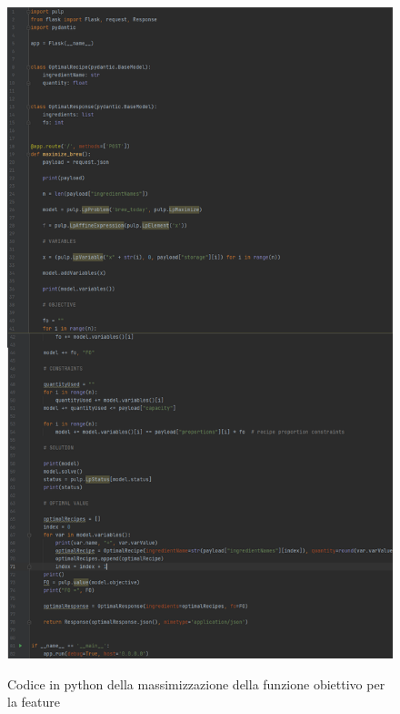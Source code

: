 \documentclass{article}
\begin{document}
\begin{figure}[h!]
\centering
\includegraphics[scale=0.51]{maximize1.PNG}
\label{fig:Codice in python della massimizzazione della funzione obiettivo per la feature}
\caption{Codice in python della massimizzazione della funzione obiettivo per la feature}
\end{figure}
\clearpage
\end{document}
